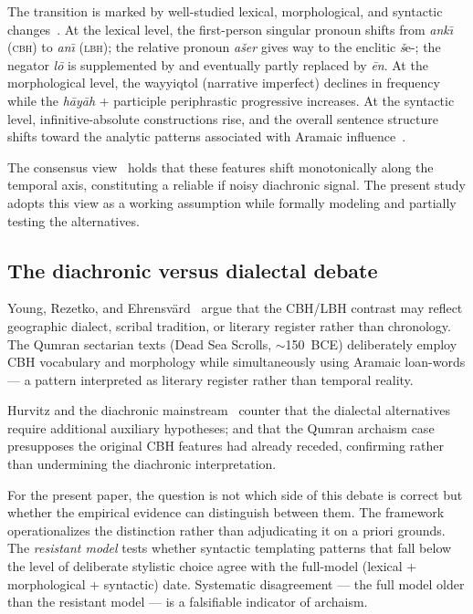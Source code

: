 \documentclass[10pt,letterpaper]{article}
\newcommand{\cbh}{CBH}
\begin{document}
The transition is marked by well-studied lexical, morphological, and
syntactic changes~\cite{Hurvitz1997,Rooker1990,Polzin1976,Young2003,Hornkohl2013}.  At the
lexical level, the first-person singular pronoun shifts from \textit{ank\={\i}}
(\textsc{cbh}) to \textit{an\={\i}} (\textsc{lbh}); the relative
pronoun \textit{ašer} gives way to the enclitic \textit{š}e-; the negator
\textit{l\={o}\textquotesingle} is supplemented by and eventually partly
replaced by \textit{\textquotesingle \={e}n}.  At the morphological level,
the wayyiqtol (narrative imperfect) declines in frequency while the
\textit{h\={a}y\={a}h} + participle periphrastic progressive increases.
At the syntactic level, infinitive-absolute constructions rise, and the
overall sentence structure shifts toward the analytic patterns associated
with Aramaic influence~\cite{Young2008,Rezetko2014}.

The consensus view~\cite{Hurvitz1982,Hurvitz2014,Robertson1972,Schniedewind2004} holds that
these features shift monotonically along the temporal axis, constituting a
reliable if noisy diachronic signal.  The present study adopts this view as
a working assumption while formally modeling and partially testing the
alternatives.

\subsection*{The diachronic versus dialectal debate}

Young, Rezetko, and Ehrensv\"{a}rd~\cite{Young2008} argue that the CBH/LBH
contrast may reflect geographic dialect, scribal tradition, or literary
register rather than chronology.  The Qumran sectarian texts (Dead Sea
Scrolls, $\sim$150~BCE) deliberately employ \cbh{} vocabulary and
morphology while simultaneously using Aramaic loan-words --- a pattern
interpreted as literary register rather than temporal reality.

Hurvitz and the diachronic mainstream~\cite{Hurvitz1997} counter that the
dialectal alternatives require additional auxiliary hypotheses; and that
the Qumran archaism case presupposes the original \cbh{} features had
already receded, confirming rather than undermining the diachronic
interpretation.

For the present paper, the question is not which side of this debate is
correct but whether the empirical evidence can distinguish between them.
The framework operationalizes the distinction rather than adjudicating it
on a priori grounds.  The
\emph{resistant model} tests whether syntactic templating patterns that
fall below the level of deliberate stylistic choice agree with the
full-model (lexical + morphological + syntactic) date.  Systematic
disagreement --- the full model older than the resistant model --- is a
falsifiable indicator of archaism.
\end{document}
